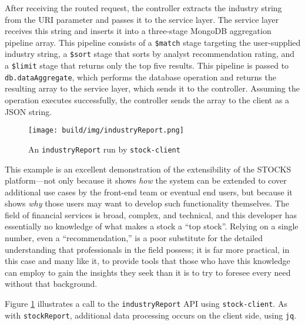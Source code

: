 \documentclass[
11pt,
titlepage,
]{article}
\begin{document}
After receiving the routed request, the controller extracts the industry string
from the URI parameter and passes it to the service layer. The service layer
receives this string and inserts it into a three-stage MongoDB aggregation
pipeline array. This pipeline consists of a \texttt{\$match} stage targeting
the user-supplied industry string, a \texttt{\$sort} stage that sorts by analyst
recommendation rating, and a \texttt{\$limit} stage that returns only the top
five results. This pipeline is passed to \texttt{db.dataAggregate}, which
performs the database operation and returns the resulting array to the service
layer, which sends it to the controller. Assuming the operation executes
successfully, the controller sends the array to the client as a JSON string.

\begin{figure}[tp]
  \texttt{[image: build/img/industryReport.png]}
  \caption{An \texttt{industryReport} run by \texttt{stock-client}}
  \label{fig:industryReport}
\end{figure}

This example is an excellent demonstration of the extensibility of the STOCKS
platform---not only because it shows \textit{how} the system can be extended to
cover additional use cases by the front-end team or eventual end users, but
because it shows \textit{why} those users may want to develop such functionality
themselves. The field of financial services is broad, complex, and technical,
and this developer has essentially no knowledge of what makes a stock a ``top
stock''. Relying on a single number, even a ``recommendation,'' is a poor
substitute for the detailed understanding that professionals in the field
possess; it is far more practical, in this case and many like it, to provide
tools that those who have this knowledge can employ to gain the insights they
seek than it is to try to foresee every need without that background.

Figure \ref{fig:industryReport} illustrates a call to the
\texttt{industryReport} API using \texttt{stock-client}. As with
\texttt{stockReport}, additional data processing occurs on the client side,
using \texttt{jq}.
\end{document}
